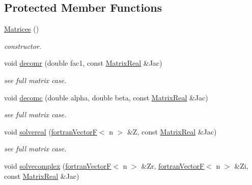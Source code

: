 \subsection*{Protected Member Functions}
\begin{DoxyCompactItemize}
\item 
\hyperlink{classodes_1_1Matrices_3_01false_00_01false_00_01n_00_01nsub_00_01nsup_01_4_a20f562ec507babcd1ee23844f2c90b7e}{Matrices} ()
\begin{DoxyCompactList}\small\item\em constructor. \end{DoxyCompactList}\item 
void \hyperlink{classodes_1_1Matrices_3_01false_00_01false_00_01n_00_01nsub_00_01nsup_01_4_aec1919c48acf54a474a69c9b2d1db952}{decomr} (double fac1, const \hyperlink{classodes_1_1Matrices_3_01false_00_01false_00_01n_00_01nsub_00_01nsup_01_4_a16870437fa110da1b60636c6e108b357}{Matrix\-Real} \&Jac)
\begin{DoxyCompactList}\small\item\em see full matrix case. \end{DoxyCompactList}\item 
void \hyperlink{classodes_1_1Matrices_3_01false_00_01false_00_01n_00_01nsub_00_01nsup_01_4_a86f9653f45c84a8b35cceb44ae0491d1}{decomc} (double alpha, double beta, const \hyperlink{classodes_1_1Matrices_3_01false_00_01false_00_01n_00_01nsub_00_01nsup_01_4_a16870437fa110da1b60636c6e108b357}{Matrix\-Real} \&Jac)
\begin{DoxyCompactList}\small\item\em see full matrix case. \end{DoxyCompactList}\item 
void \hyperlink{classodes_1_1Matrices_3_01false_00_01false_00_01n_00_01nsub_00_01nsup_01_4_a5fd66e27292eca6b52c24b14a1a123e5}{solvereal} (\hyperlink{classodes_1_1fortranVectorF}{fortran\-Vector\-F}$<$ n $>$ \&Z, const \hyperlink{classodes_1_1Matrices_3_01false_00_01false_00_01n_00_01nsub_00_01nsup_01_4_a16870437fa110da1b60636c6e108b357}{Matrix\-Real} \&Jac)
\begin{DoxyCompactList}\small\item\em see full matrix case. \end{DoxyCompactList}\item 
void \hyperlink{classodes_1_1Matrices_3_01false_00_01false_00_01n_00_01nsub_00_01nsup_01_4_a78bffe78fc1f1e5a1380a74c76d25f6f}{solvecomplex} (\hyperlink{classodes_1_1fortranVectorF}{fortran\-Vector\-F}$<$ n $>$ \&Zr, \hyperlink{classodes_1_1fortranVectorF}{fortran\-Vector\-F}$<$ n $>$ \&Zi, const \hyperlink{classodes_1_1Matrices_3_01false_00_01false_00_01n_00_01nsub_00_01nsup_01_4_a16870437fa110da1b60636c6e108b357}{Matrix\-Real} \&Jac)

\end{DoxyCompactItemize}
